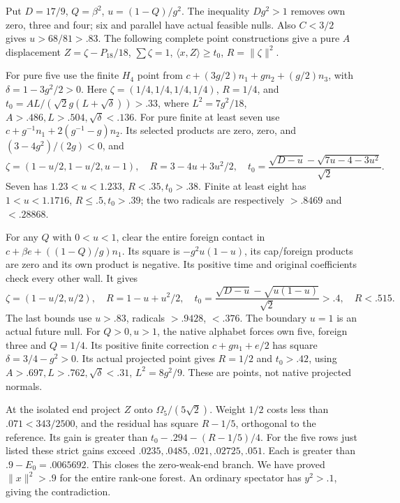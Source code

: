 \documentclass[11pt]{article}
\theoremstyle{definition}
\theoremstyle{remark}
\newcommand{\ip}[2]{\langle #1,#2\rangle}
\newcommand{\norm}[1]{\lVert #1\rVert}
\begin{document}
Put \(D=17/9\), \(Q=\beta^2\), \(u=(1-Q)/g^2\).
The inequality \(Dg^2>1\) removes own zero, three and four;
six and parallel have actual feasible nulls. Also \(C<3/2\)
gives \(u>68/81>.83\). The following complete point constructions
give a pure \(A\) displacement \(Z=\zeta-P_{18}/18\),
\(\sum\zeta=1\), \(\ip xZ\ge t_0\), \(R=\norm\zeta^2\).

For pure five use the finite \(H_4\) point from
\(c+(3g/2)n_1+gn_2+(g/2)n_3\), with
\(\delta=1-3g^2/2>0\). Here \(\zeta=(1/4,1/4,1/4,1/4)\),
\(R=1/4\), and
\(t_0=AL/(\sqrt2g(L+\sqrt\delta))>.33\), where
\(L^2=7g^2/18\), \(A>.486,L>.504,\sqrt\delta<.136\).
For pure finite at least seven use
\(c+g^{-1}n_1+2(g^{-1}-g)n_2\). Its selected products are
zero, zero, and \((3-4g^2)/(2g)<0\), and
\[
 \zeta=(1-u/2,1-u/2,u-1),\quad R=3-4u+3u^2/2,
 \quad t_0={\frac{\sqrt{D-u}-\sqrt{7u-4-3u^2}}{\sqrt2}}.
\]
Seven has \(1.23<u<1.233\), \(R<.35,t_0>.38\).
Finite at least eight has \(1<u<1.1716\), \(R\le.5,t_0>.39\);
the two radicals are respectively \(>.8469\) and \(<.28868\).

For any \(Q\) with \(0<u<1\), clear the entire foreign contact
in \(c+\beta e+((1-Q)/g)n_1\). Its square is
\(-g^2u(1-u)\), its cap/foreign products are zero and its own
product is negative. Its positive time and original coefficients
check every other wall. It gives
\[
 \zeta=(1-u/2,u/2),\quad R=1-u+u^2/2,\quad
 t_0={\frac{\sqrt{D-u}-\sqrt{u(1-u)}}{\sqrt2}}>.4,
 \quad R<.515.
\]
The last bounds use \(u>.83\), radicals \(>.9428\), \(<.376\).
The boundary \(u=1\) is an actual future null.
For \(Q>0,u>1\), the native alphabet forces own five,
foreign three and \(Q=1/4\). Its positive finite correction
\(c+gn_1+e/2\) has square \(\delta=3/4-g^2>0\).
Its actual projected point gives \(R=1/2\) and \(t_0>.42\),
using \(A>.697,L>.762,\sqrt\delta<.31\),
\(L^2=8g^2/9\). These are points, not native projected normals.

At the isolated end project \(Z\) onto \(\Omega_5/(5\sqrt2)\).
Weight \(1/2\) costs less than \(.071<343/2500\), and the
residual has square \(R-1/5\), orthogonal to the reference.
Its gain is greater than \(t_0-.294-(R-1/5)/4\).
For the five rows just listed these strict gains exceed
\(.0235,.0485,.021,.02725,.051\). Each is greater than
\(.9-E_0=.0065692\). This closes the zero-weak-end branch.
We have proved \(\norm x^2>.9\) for the entire rank-one forest.
An ordinary spectator has \(y^2>.1\), giving the contradiction.
\end{document}
